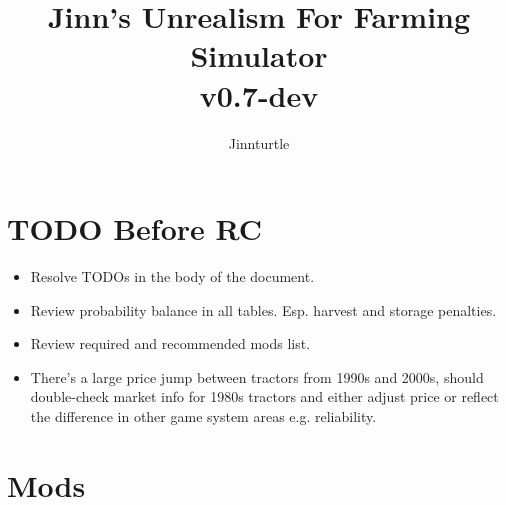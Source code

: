 \documentclass[a4paper,10pt]{article}
\begin{document}
\newlength{\tabcolsepDefault}
\setlength{\tabcolsepDefault}{\tabcolsep}




\newcommand{\textbi}[1]{\textbf{\textit{#1}}}

\newcommand{\projName}{Jinn's Unrealism For Farming Simulator}
\newcommand{\projVersion}{v0.7-dev}

\newcommand{\refPageref}[1]{\ref{#1} (p. \pageref{#1})}


\title{\projName{}\\ \projVersion{}}
\author{Jinnturtle}

\maketitle
\tableofcontents


\section{TODO Before RC}
\begin{itemize}
\item Resolve TODOs in the body of the document.
\item Review probability balance in all tables. Esp. harvest and storage
  penalties.
\item Review required and recommended mods list.
\item There's a large price jump between tractors from 1990s and 2000s,
  should double-check market info for 1980s tractors and either adjust price or
  reflect the difference in other game system areas e.g. reliability.
\end{itemize}


\section{Mods}
\end{document}
